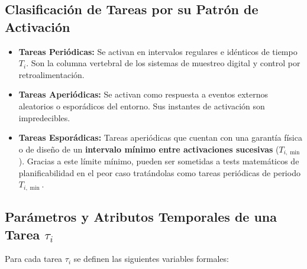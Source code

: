\subsection{Clasificación de Tareas por su Patrón de Activación}
\begin{itemize}[leftmargin=*]
    \item \textbf{Tareas Periódicas:} Se activan en intervalos regulares e idénticos de tiempo $T_i$. Son la columna vertebral de los sistemas de muestreo digital y control por retroalimentación.
    \item \textbf{Tareas Aperiódicas:} Se activan como respuesta a eventos externos aleatorios o esporádicos del entorno. Sus instantes de activación son impredecibles.
    \item \textbf{Tareas Esporádicas:} Tareas aperiódicas que cuentan con una garantía física o de diseño de un \textbf{intervalo mínimo entre activaciones sucesivas} ($T_{i,\min}$). Gracias a este límite mínimo, pueden ser sometidas a tests matemáticos de planificabilidad en el peor caso tratándolas como tareas periódicas de periodo $T_{i,\min}$.
\end{itemize}

\subsection{Parámetros y Atributos Temporales de una Tarea \texorpdfstring{$\tau_i$}{tau\_i}}
Para cada tarea $\tau_i$ se definen las siguientes variables formales:

